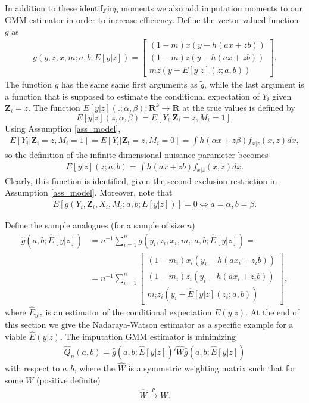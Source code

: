 \documentclass{article}
\theoremstyle{definition}
\theoremstyle{remark}
\begin{document}
In addition to these identifying moments we also add imputation moments to our GMM estimator in order to increase efficiency. Define the vector-valued function $g$ as
\begin{align}
    g(y,z,x,m; a,b; E[y|z])=\left[\begin{array}{c}
        (1-m) x(y- h(a x+zb))  \\
        (1-m) z(y- h(a x+z b)) \\
          m z(y- E[y|z](z; a, b))
    \end{array}\right].
\end{align}
The function $g$ has the same same first arguments as $\tilde{g}$, while the last argument is a function that is supposed to estimate the conditional expectation of $Y_i$ given $\mathbf{Z}_i=z$. The function $E[y|z](.; \alpha, \beta): \mathbf{R}^k \rightarrow \mathbf{R}$ at the true values is defined by
\[E[y|z](z, \alpha, \beta)= E[Y_i| \mathbf{Z}_i=z, M_i=1]. 
\]
Using Assumption \ref{ass_model},
\begin{align}
    E[Y_i|\mathbf{Z_i}=z, M_i=1]=E[Y_i|\mathbf{Z_i}=z, M_i=0]= \int h(\alpha x + z \beta) f_{x|z}(x,z) dx,
\end{align}
so the definition of the infinite dimensional nuisance parameter becomes
\begin{align}
E[y|z](z; a, b) = \int h(a x + z b) f_{x|z}(x,z) dx.
\end{align}
Clearly, this function is identified, given the second exclusion restriction in Assumption \ref{ass_model}. Moreover, note that
\begin{align}
E[g(Y_i,\mathbf{Z}_i,X_i,M_i; a,b; E[y|z])]=0 \iff a=\alpha, b=\beta.
\end{align}

Define the sample analogues (for a sample of size $n$)
\begin{align}
    \hat{g}(a,b; \hat{E}[y|z])&=n^{-1}\sum_{i=1}^n g(y_i,z_i,x_i,m_i; a,b; \hat{E}[y|z])= \\
    &=n^{-1}\sum_{i=1}^n\left[\begin{array}{c}
        (1-m_i) x_i(y_i- h(ax_i+z_i b))  \\
        (1-m_i) z_i(y_i- h(ax_i+z_i b)) \\
          m_i z_i(y_i- \hat{E}[y|z](z_i; a,b))
    \end{array}\right], \nonumber %
\end{align}
where $\hat{E}_{y|z}$ is an estimator of the conditional expectation $E(y|z)$. At the end of this section we give the Nadaraya-Watson estimator as a specific example for a viable $\hat{E}(y|z)$. The imputation GMM estimator is minimizing
\begin{align}
    \hat{Q}_n(a,b)= \hat{g}(a,b;\hat{E}[y|z])'\hat{W}\hat{g}(a,b;\hat{E}[y|z])
\end{align}
with respect to $a,b$, where the $\hat{W}$ is a symmetric weighting matrix such that for some $W$ (positive definite)
\begin{align}
    \hat{W} \stackrel{p}{\rightarrow}W.
\end{align}
\end{document}
